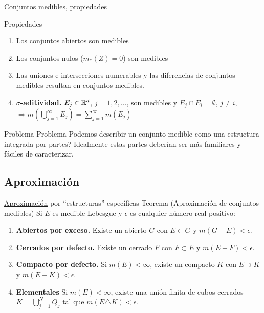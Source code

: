 Conjuntos medibles, propiedades

{Propiedades}
    \begin{enumerate}
   \item Los conjuntos abiertos son medibles 
   \item Los conjuntos nulos ($m_*(Z)=0$) son medibles
   \item Las uniones e intersecciones numerables y las diferencias de 
conjuntos medibles resultan en conjuntos medibles.
   \item\textbf{$\sigma$-aditividad.} $E_j\in\mathbb{R}^d$, $j=1,2,\ldots$, son 
medibles y $E_j\cap E_i=\emptyset$, $j\neq i$,  $\Rightarrow \boxed{ 
m\left(\bigcup_{j=1}^{\infty}E_j\right)=\sum_{j=1}^{\infty}m(E_j)}$  

  \end{enumerate}
  




% 
% 
%   
% 
% 
% 
% 

Problema
  {Problema}
   Podemos describir un conjunto medible como una estructura integrada por partes? Idealmente estas partes deberían ser más familiares y fáciles de caracterizar.
  


\subsection{Aproximación}
\underline{Aproximación} por ``estructuras'' específicas
  {Teorema (Aproximación de conjuntos medibles)} Si $E$ es medible Lebesgue y $\epsilon$ es cualquier número real positivo:
  \begin{enumerate}
   \item\textbf{Abiertos por exceso.} Existe un abierto $G$ con $E\subset G$ y $m(G-E)<\epsilon$.
   \item\textbf{Cerrados por defecto.} Existe un cerrado $F$ con 
$F\subset E$ y $m(E-F)<\epsilon$.
   \item \textbf{Compacto por defecto.} Si $m(E)<\infty$, existe un compacto $K$ con $E\supset K$ y $m(E-K)<\epsilon$.
   \item\textbf{Elementales} Si $m(E)<\infty$, existe una unión finita de cubos cerrados   $K=\bigcup_{j=1}^NQ_j$ tal que $m(E\triangle K)<\epsilon$.
  \end{enumerate}


